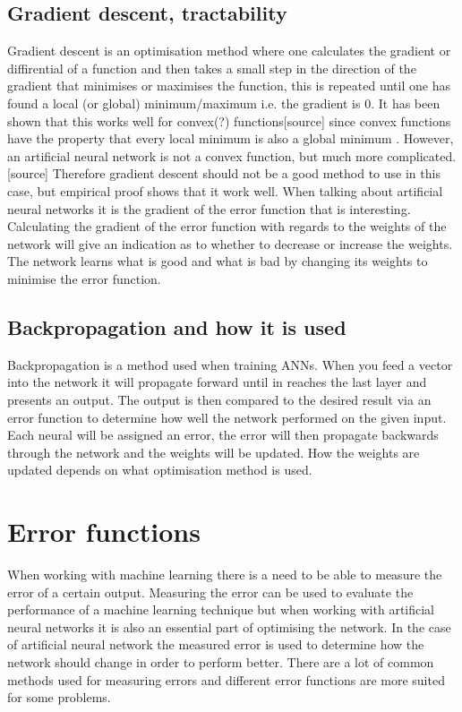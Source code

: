 \subsection{Gradient descent, tractability}%
Gradient descent is an optimisation method where one calculates the gradient or diffirential of a function and then takes a small step in the direction of the gradient that minimises or maximises the function, this is repeated until one has found a local (or global) minimum/maximum i.e. the gradient is 0. It has been shown that this works well for convex(?) functions[source] since convex functions have the property that every local minimum is also a global minimum . However, an artificial neural network is not a convex function, but much more complicated.[source] Therefore gradient descent should not be a good method to use in this case, but empirical proof shows that it work well. %
When talking about artificial neural networks it is the gradient of the error function that is interesting. Calculating the gradient of the error function with regards to the weights of the network will give an indication as to whether to decrease or increase the weights. The network learns what is good and what is bad by changing its weights to minimise the error function.

\subsection{Backpropagation and how it is used}
Backpropagation is a method used when training ANNs. When you feed a vector into the network it will propagate forward until in reaches the last layer and presents an output. The output is then compared to the desired result via an error function to determine how well the network performed on the given input. Each neural will be assigned an error, the error will then propagate backwards through the network and the weights will be updated. How the weights are updated depends on what optimisation method is used.


\section{Error functions} %
When working with machine learning there is a need to be able to measure the error of a certain output. Measuring the error can be used to evaluate the performance of a machine learning technique but when working with artificial neural networks it is also an essential part of optimising the network. In the case of artificial neural network the measured error is used to determine how the network should change in order to perform better. There are a lot of common methods used for measuring errors and different error functions are more suited for some problems.

